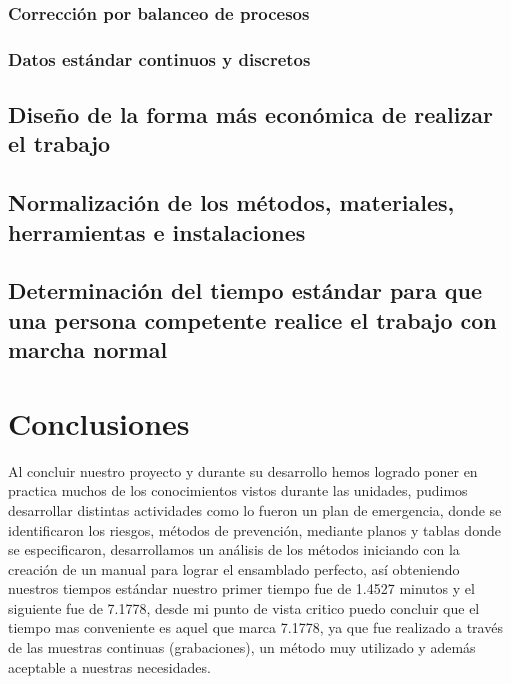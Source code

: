     \subsubsection{Corrección por balanceo de procesos}
    \subsubsection{Datos estándar continuos y discretos}
    \subsection{Diseño de la forma más económica de realizar el trabajo}
    
    \subsection{Normalización de los métodos, materiales, herramientas e instalaciones}
    
    \subsection{Determinación del tiempo estándar para que una persona competente realice el trabajo con marcha normal}
    
    
    \section{Conclusiones}
    Al concluir nuestro proyecto y durante su desarrollo hemos logrado poner en practica muchos de los conocimientos vistos durante las unidades, pudimos desarrollar distintas actividades como lo fueron un plan de emergencia, donde se identificaron los riesgos, métodos de prevención, mediante planos y tablas donde se especificaron, desarrollamos un análisis de los métodos iniciando con la creación de un manual para lograr el ensamblado perfecto, así obteniendo nuestros tiempos estándar nuestro primer tiempo fue de 1.4527 minutos y el siguiente fue de 7.1778, desde mi punto de vista critico puedo concluir que el tiempo mas conveniente es aquel que marca 7.1778, ya que fue realizado a través de las muestras continuas (grabaciones), un método muy utilizado y además aceptable a nuestras necesidades. 
    
